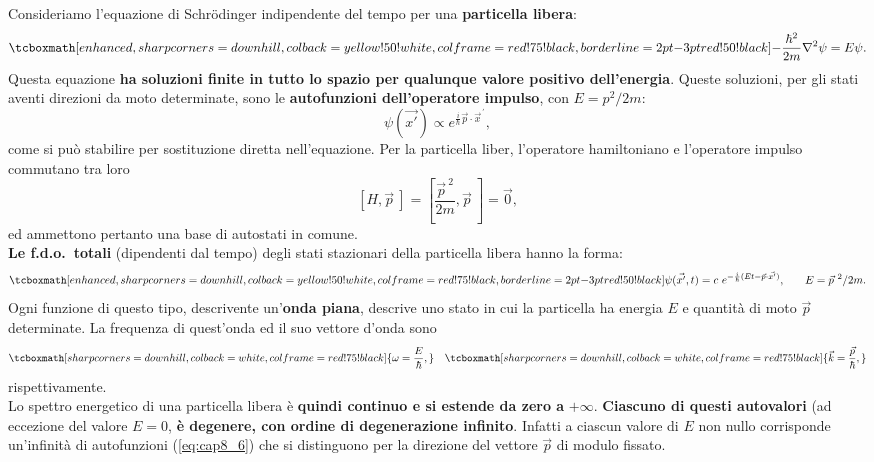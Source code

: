 Consideriamo l'equazione di Schr\"{o}dinger indipendente del tempo per una \textbf{particella libera}:
	\begin{equation}
		\tcboxmath[enhanced, sharp corners=downhill, colback=yellow!50!white, colframe=red!75!black, borderline={2pt}{-3pt}{red!50!black}]{
			-\frac{\hbar ^2}{2m}\nabla ^2 \psi = E\psi.
			}
	\end{equation}
Questa equazione \textbf{ha soluzioni finite in tutto lo spazio per qualunque valore positivo dell'energia}. Queste soluzioni, per gli stati aventi direzioni da moto determinate, sono le \textbf{autofunzioni dell'operatore impulso}, con $E= p^2/2m$:
	\begin{equation}
		\psi (\vec{x'}) \propto e ^{\frac{i}{\hbar}\vec{p}\cdot {\vec{x}}^{\, \prime}},
	\end{equation}
come si può stabilire per sostituzione diretta nell'equazione. Per la particella liber, l'operatore hamiltoniano e l'operatore impulso commutano tra loro
	\begin{equation}
		\left[ H, \vec{p}\ \right] = \left[ \frac{ {\vec{p}}^{\ 2}}{2m}, \vec{p}\ \right] =\vec{0},
	\end{equation}
ed ammettono pertanto una base di autostati in comune.\\
\textbf{Le f.d.o.~totali} (dipendenti dal tempo) degli stati stazionari della particella libera hanno la forma:
	\begin{equation}
		\tcboxmath[enhanced, sharp corners=downhill, colback=yellow!50!white, colframe=red!75!black, borderline={2pt}{-3pt}{red!50!black}]{
			\psi (\vec{x'}, t) = c\ e^{-\frac{i}{\hbar} (Et - \vec{p}\cdot \vec{x'})},} \qquad E={\vec{p}}^{\ 2}/{2m}.
	\label{eq:cap8_6}
	\end{equation}
Ogni funzione di questo tipo, descrivente un'\textbf{onda piana}, descrive uno stato in cui la particella ha energia $E$ e quantità di moto $\vec{p}$ determinate. La frequenza di quest'onda ed il suo vettore d'onda sono
	\begin{equation}
		\tcboxmath[sharp corners=downhill, colback=white, colframe=red!75!black]{
		\omega = \frac{E}{\hbar},
		} \quad 
	\tcboxmath[sharp corners=downhill, colback=white, colframe=red!75!black]{
		\vec{k}= \frac{\vec{p}}{\hbar},
		}
	\end{equation}
rispettivamente.\\

Lo spettro energetico di una particella libera è \textbf{quindi continuo e si estende da zero a} $+\infty$. \textbf{Ciascuno di questi autovalori} (ad eccezione del valore $E=0$, \textbf{è degenere, con ordine di degenerazione infinito}. Infatti a ciascun valore di $E$ non nullo corrisponde un'infinità di autofunzioni (\ref{eq:cap8_6}) che si distinguono per la direzione del vettore $\vec{p}$ di modulo fissato.
